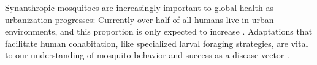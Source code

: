 Synanthropic mosquitoes are increasingly important to global health as urbanization progresses: Currently over half of all humans live in urban environments, and this proportion is only expected to increase \cite{Goddard2010-wf}. Adaptations that facilitate human cohabitation, like specialized larval foraging strategies, are vital to our understanding of mosquito behavior and success as a disease vector \cite{Gubler2014-no}. 


